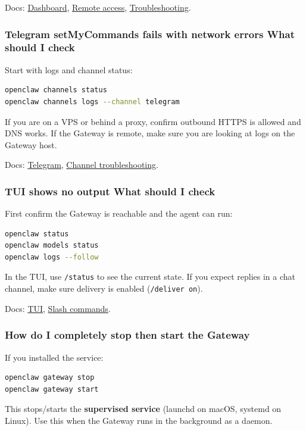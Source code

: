 Docs: \href{/web/dashboard}{Dashboard}, \href{/gateway/remote}{Remote access}, \href{/gateway/troubleshooting}{Troubleshooting}.

\subsubsection{Telegram setMyCommands fails with network errors What should I check}


Start with logs and channel status:

\begin{lstlisting}[language=bash]
openclaw channels status
openclaw channels logs --channel telegram
\end{lstlisting}


If you are on a VPS or behind a proxy, confirm outbound HTTPS is allowed and DNS works.
If the Gateway is remote, make sure you are looking at logs on the Gateway host.

Docs: \href{/channels/telegram}{Telegram}, \href{/channels/troubleshooting}{Channel troubleshooting}.

\subsubsection{TUI shows no output What should I check}


First confirm the Gateway is reachable and the agent can run:

\begin{lstlisting}[language=bash]
openclaw status
openclaw models status
openclaw logs --follow
\end{lstlisting}


In the TUI, use \texttt{/status} to see the current state. If you expect replies in a chat
channel, make sure delivery is enabled (\texttt{/deliver on}).

Docs: \href{/web/tui}{TUI}, \href{/tools/slash-commands}{Slash commands}.

\subsubsection{How do I completely stop then start the Gateway}


If you installed the service:

\begin{lstlisting}[language=bash]
openclaw gateway stop
openclaw gateway start
\end{lstlisting}


This stops/starts the \textbf{supervised service} (launchd on macOS, systemd on Linux).
Use this when the Gateway runs in the background as a daemon.


